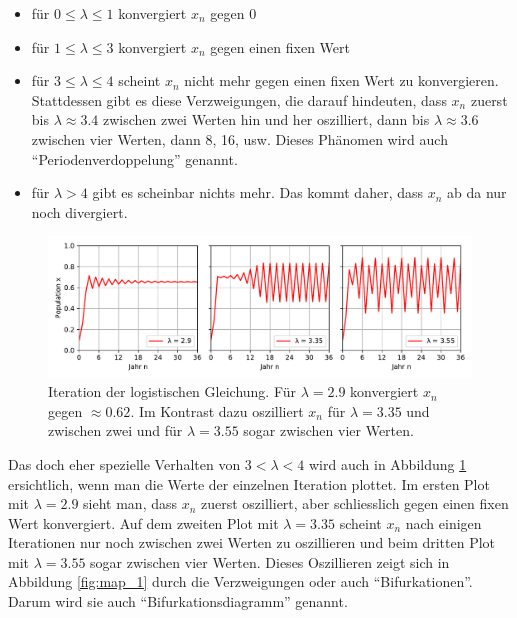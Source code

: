 \begin{itemize}
    \item 
    für $0 \le \lambda \le 1$ konvergiert $x_n$ gegen 0
    \item 
    für $1 \le \lambda \le 3$ konvergiert $x_n$ gegen einen fixen Wert
    \item 
    für $3 \le \lambda \le 4$ scheint $x_n$ nicht mehr gegen einen fixen Wert zu konvergieren.
    Stattdessen gibt es diese Verzweigungen, 
%
    die darauf hindeuten, 
    dass $x_n$ zuerst bis $\lambda \approx 3.4$ zwischen zwei Werten hin und her oszilliert, 
    dann bis $\lambda \approx 3.6$ zwischen vier Werten, dann 8, 16, usw. 
    Dieses Phänomen wird auch ``Periodenverdoppelung'' genannt.
%
    \item
    für $\lambda > 4$ gibt es scheinbar nichts mehr.
    Das kommt daher, dass $x_n$ ab da nur noch divergiert.  
\end{itemize}
\begin{figure}
    \includegraphics[width=\linewidth]{papers/logistic/figures/pop_logistic_2.pdf}
    \caption{
        Iteration der logistischen Gleichung. 
        Für $\lambda = 2.9$ konvergiert $x_n$ gegen
        $\approx 0.62$.
        Im Kontrast dazu oszilliert $x_n$ für
        $\lambda = 3.35$ und zwischen zwei 
        und für
        $\lambda = 3.55$ sogar zwischen vier Werten. 
    }
    \label{fig:pop_logistic_2}
\end{figure}
Das doch eher spezielle Verhalten von $3 < \lambda < 4$ wird 
auch in Abbildung \ref{fig:pop_logistic_2} ersichtlich,
wenn man die Werte der einzelnen Iteration plottet.
Im ersten Plot mit $\lambda = 2.9$ sieht man, dass $x_n$ zuerst oszilliert,
aber schliesslich gegen einen fixen Wert konvergiert.
Auf dem zweiten Plot mit $\lambda = 3.35$ scheint $x_n$ 
nach einigen Iterationen nur noch
zwischen zwei Werten zu oszillieren und beim
dritten Plot mit $\lambda = 3.55$ sogar zwischen vier Werten. 
Dieses Oszillieren zeigt sich in Abbildung \ref{fig:map_1}
durch die Verzweigungen oder auch ``Bifurkationen''. 
%
%
Darum wird sie auch ``Bifurkationsdiagramm'' genannt. 

